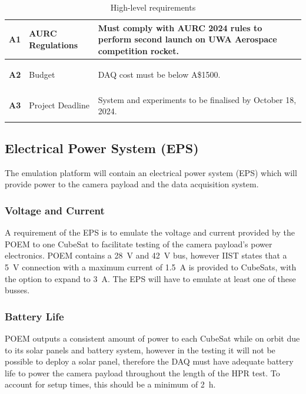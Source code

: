 \documentclass{report}
\newcommand{\aud}{A\$}
\begin{document}
\begin{table}[h!]
\begin{tabular}{|l|L{0.25\textwidth}|L{0.6\textwidth}|}
    \hypertarget{req-A1}{\textbf{A1}} & AURC Regulations               & Must comply with AURC 2024 rules to perform second launch on UWA Aerospace competition rocket.              \\ \hline
    \hypertarget{req-A2}{\textbf{A2}} & Budget                         & DAQ cost must be below \aud 1500.                                                                           \\ \hline
    \hypertarget{req-A3}{\textbf{A3}} & Project Deadline               & System and experiments to be finalised by October 18, 2024.                                                 \\ \hline
  \end{tabular}
  \caption{High-level requirements}
  \label{tabl:high-level-requirements}
\end{table}


\subsection{Electrical Power System (EPS)}
The emulation platform will contain an electrical power system (EPS) which will provide power to the camera payload and the data acquisition system.

\subsubsection{Voltage and Current}
A requirement of the EPS is to emulate the voltage and current provided by the POEM to one CubeSat to facilitate testing of the camera payload's power electronics. POEM contains a \SI{28}{\volt} and \SI{42}{\volt} bus, however IIST states that a \SI{5}{\volt} connection with a maximum current of \SI{1.5}{\ampere} is provided to CubeSats, with the option to expand to \SI{3}{\ampere}. The EPS will have to emulate at least one of these busses.

\subsubsection{Battery Life}
POEM outputs a consistent amount of power to each CubeSat while on orbit due to its solar panels and battery system, however in the testing it will not be possible to deploy a solar panel, therefore the DAQ must have adequate battery life to power the camera payload throughout the length of the HPR test. To account for setup times, this should be a minimum of \SI{2}{\hour}.
\end{document}
